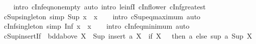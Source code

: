 \begin{isabellebody}
%
\isadelimproof
\ \ %
\endisadelimproof
%
\isatagproof
{}\isamarkupfalse%
\ {\isacharparenleft}{\kern0pt}intro\ cInf{\isacharunderscore}{\kern0pt}eq{\isacharunderscore}{\kern0pt}non{\isacharunderscore}{\kern0pt}empty{\isacharparenright}{\kern0pt}\ {\isacharparenleft}{\kern0pt}auto\ intro{\isacharcolon}{\kern0pt}\ le{\isacharunderscore}{\kern0pt}infI{}\ cInf{\isacharunderscore}{\kern0pt}lower\ cInf{\isacharunderscore}{\kern0pt}greatest{\isacharparenright}{\kern0pt}%
\endisatagproof
{\isafoldproof}%
%
\isadelimproof
\isanewline
%
\endisadelimproof
\isanewline
{}\isamarkupfalse%
\ cSup{\isacharunderscore}{\kern0pt}singleton\ {\isacharbrackleft}{\kern0pt}simp{\isacharbrackright}{\kern0pt}{\isacharcolon}{\kern0pt}\ {\isachardoublequoteopen}Sup\ {\isacharbraceleft}{\kern0pt}x{\isacharbraceright}{\kern0pt}\ {\isacharequal}{\kern0pt}\ x{\isachardoublequoteclose}\isanewline
%
\isadelimproof
\ \ %
\endisadelimproof
%
\isatagproof
{}\isamarkupfalse%
\ {\isacharparenleft}{\kern0pt}intro\ cSup{\isacharunderscore}{\kern0pt}eq{\isacharunderscore}{\kern0pt}maximum{\isacharparenright}{\kern0pt}\ auto%
\endisatagproof
{\isafoldproof}%
%
\isadelimproof
\isanewline
%
\endisadelimproof
\isanewline
{}\isamarkupfalse%
\ cInf{\isacharunderscore}{\kern0pt}singleton\ {\isacharbrackleft}{\kern0pt}simp{\isacharbrackright}{\kern0pt}{\isacharcolon}{\kern0pt}\ {\isachardoublequoteopen}Inf\ {\isacharbraceleft}{\kern0pt}x{\isacharbraceright}{\kern0pt}\ {\isacharequal}{\kern0pt}\ x{\isachardoublequoteclose}\isanewline
%
\isadelimproof
\ \ %
\endisadelimproof
%
\isatagproof
{}\isamarkupfalse%
\ {\isacharparenleft}{\kern0pt}intro\ cInf{\isacharunderscore}{\kern0pt}eq{\isacharunderscore}{\kern0pt}minimum{\isacharparenright}{\kern0pt}\ auto%
\endisatagproof
{\isafoldproof}%
%
\isadelimproof
\isanewline
%
\endisadelimproof
\isanewline
{}\isamarkupfalse%
\ cSup{\isacharunderscore}{\kern0pt}insert{\isacharunderscore}{\kern0pt}If{\isacharcolon}{\kern0pt}\ \ {\isachardoublequoteopen}bdd{\isacharunderscore}{\kern0pt}above\ X\ {\isasymLongrightarrow}\ Sup\ {\isacharparenleft}{\kern0pt}insert\ a\ X{\isacharparenright}{\kern0pt}\ {\isacharequal}{\kern0pt}\ {\isacharparenleft}{\kern0pt}if\ X\ {\isacharequal}{\kern0pt}\ {\isacharbraceleft}{\kern0pt}{\isacharbraceright}{\kern0pt}\ then\ a\ else\ sup\ a\ {\isacharparenleft}{\kern0pt}Sup\ X{\isacharparenright}{\kern0pt}{\isacharparenright}{\kern0pt}{\isachardoublequoteclose}\isanewline
%
\isadelimproof
\ \ %
\endisadelimproof
%
\isatagproof
{}\isamarkupfalse%

\end{isabellebody}
